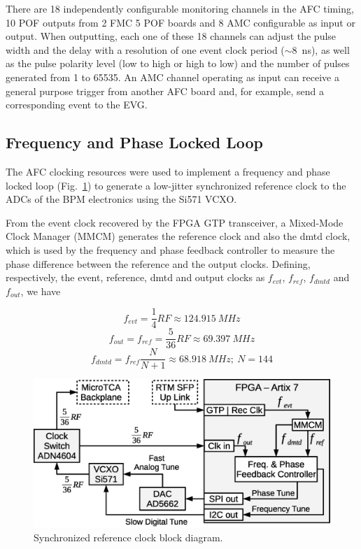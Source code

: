 \documentclass[a4paper,
               biblatex,      %
               ]{jacow}
\begin{document}
There are 18 independently configurable monitoring channels in the AFC timing, 10 POF outputs from 2 FMC 5 POF boards and 8 AMC configurable as input or output. When outputting, each one of these 18 channels can adjust the pulse width and the delay with a resolution of one event clock period ($\sim$8~ns), as well as the pulse polarity level (low to high or high to low) and the number of pulses generated from 1 to 65535. An AMC channel operating as input can receive a general purpose trigger from another AFC board and, for example, send a corresponding event to the EVG.   

\subsection{Frequency and Phase Locked Loop}
The AFC clocking resources were used to implement a frequency and phase locked loop (Fig.~\ref{fig:AFCRefClockLoop}) to generate a low-jitter synchronized reference clock to the ADCs of the BPM electronics using the Si571 VCXO.
 
From the event clock recovered by the FPGA GTP transceiver, a Mixed-Mode Clock Manager (MMCM) generates the reference clock and also the dmtd clock, which is used by the frequency and phase feedback controller to measure the phase difference between the reference and the output clocks. Defining, respectively, the event, reference, dmtd and output clocks as $f_{evt}$, $f_{ref}$, $f_{dmtd}$ and $f_{out}$, we have

\[f_{evt} = \frac{1}{4}RF \approx 124.915~MHz\]
\[f_{out} = f_{ref} = \frac{5}{36}RF \approx 69.397~MHz\]
\[f_{dmtd} = f_{ref}\frac{N}{N+1} \approx 68.918~MHz;~N=144\]

\begin{figure}[!htb]
   \centering
   \includegraphics*[width=0.9\columnwidth]{AFCRefClockLoop}
   \caption{Synchronized reference clock block diagram.}
   \label{fig:AFCRefClockLoop}
\end{figure}
\end{document}
